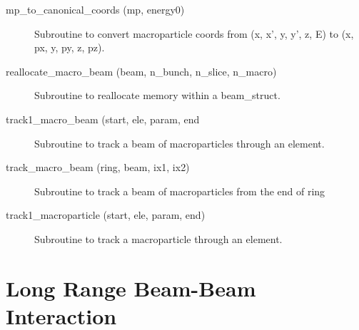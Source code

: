 \begin{description}
\item[mp\_to\_canonical\_coords (mp, energy0)] \Newline 
Subroutine to convert macroparticle coords from 
(x, x', y, y', z, E) to (x, px, y, py, z, pz).

\item[reallocate\_macro\_beam (beam, n\_bunch, n\_slice, n\_macro)] \Newline 
Subroutine to reallocate memory within a beam\_struct.

\item[track1\_macro\_beam (start, ele, param, end] \Newline
Subroutine to track a beam of macroparticles through an element.

\item[track\_macro\_beam (ring, beam, ix1, ix2)] \Newline 
Subroutine to track a beam of macroparticles from the end of
ring%

\item[track1\_macroparticle (start, ele, param, end)] \Newline 
Subroutine to track a macroparticle through an element.


\end{description}

\section{Long Range Beam-Beam Interaction}
\label{r:lrbbi}    

